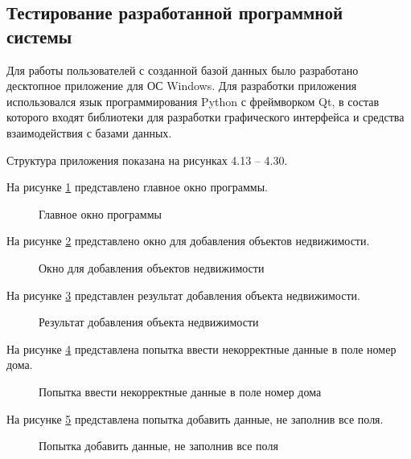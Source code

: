 \subsection{Тестирование разработанной программной системы}

Для работы пользователей с созданной базой данных было разработано десктопное приложение для ОС Windows. Для разработки приложения использовался язык программирования Python с фреймворком Qt, в состав которого входят библиотеки для разработки графического интерфейса и средства взаимодействия с базами данных.

Структура приложения показана на рисунках 4.13 – 4.30.

На рисунке \ref{главн_окно:image} представлено главное окно программы.

\begin{figure}[H]
\caption{Главное окно программы}
\label{главн_окно:image}
\end{figure}

На рисунке \ref{объект:image} представлено окно для добавления объектов недвижимости.

\begin{figure}[H]
	\caption{Окно для добавления объектов недвижимости}
	\label{объект:image}
\end{figure}

На рисунке \ref{РОбъект:image} представлен результат добавления объекта недвижимости.

\begin{figure}[H]
	\caption{Результат добавления объекта недвижимости}
	\label{РОбъект:image}
\end{figure}

На рисунке \ref{номердома:image} представлена попытка ввести некорректные данные в поле номер дома.

\begin{figure}[H]
	\caption{Попытка ввести некорректные данные в поле номер дома}
	\label{номердома:image}
\end{figure}

На рисунке \ref{невсеполя:image} представлена попытка добавить данные, не заполнив все поля.

\begin{figure}[H]
	\caption{Попытка добавить данные, не заполнив все поля}
	\label{невсеполя:image}
\end{figure}\\


